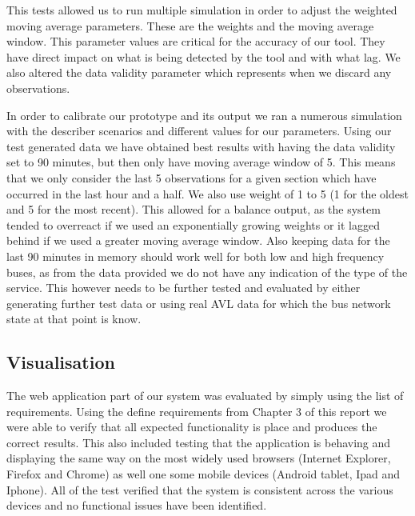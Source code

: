This tests allowed us to run multiple simulation in order to adjust the weighted moving average parameters. These are the weights and the moving average window. This parameter values are critical for the accuracy of our tool. They have direct impact on what is being detected by the tool and with what lag. We also altered the data validity parameter which represents when we discard any observations.

In order to calibrate our prototype and its output we ran a numerous simulation with the describer scenarios and different values for our parameters. Using our test generated data we have obtained best results with having the data validity set to 90 minutes, but then only have moving average window of 5. This means that we only consider the last 5 observations for a given section which have occurred in the last hour and a half. We also use weight of 1 to 5 (1 for the oldest and 5 for the most recent). This allowed for a balance output, as the system tended to overreact if we used an exponentially growing weights or it lagged behind if we used a greater moving average window. Also keeping data for the last 90 minutes in memory should work well for both low and high frequency buses, as from the data provided we do not have any indication of the type of the service. This however needs to be further tested and evaluated by either generating further test data or using real AVL data for which the bus network state at that point is know.


\subsection{Visualisation}
The web application part of our system was evaluated by simply using the list of requirements. Using the define requirements from Chapter 3 of this report we were able to verify that all expected functionality is place and produces the correct results. This also included testing that the application is behaving and displaying the same way on the most widely used browsers (Internet Explorer, Firefox and Chrome) as well one some mobile devices (Android tablet, Ipad and Iphone). All of the test verified that the system is consistent across the various devices and no functional issues have been identified.

